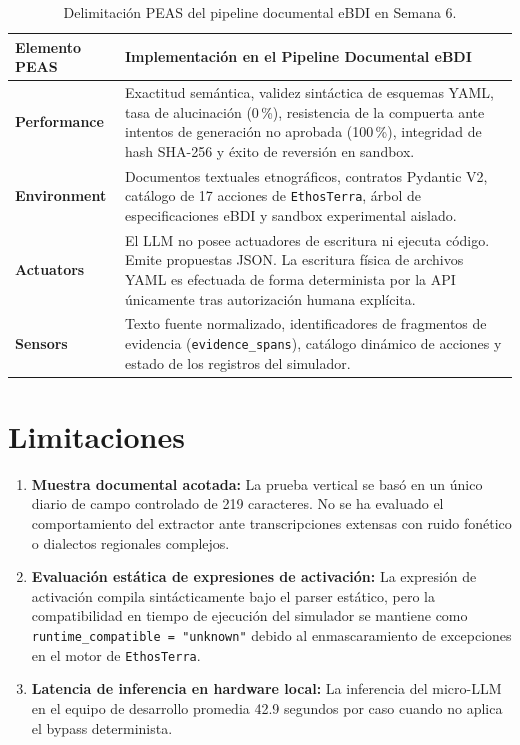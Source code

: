 \documentclass[11pt,a4paper]{article}
\begin{document}
\begin{table}[H]
\centering
\small
\begin{tabularx}{\textwidth}{lX}
\toprule
\textbf{Elemento PEAS} & \textbf{Implementación en el Pipeline Documental eBDI} \\
\midrule
\textbf{Performance} & Exactitud semántica, validez sintáctica de esquemas YAML, tasa de alucinación (0\,\%), resistencia de la compuerta ante intentos de generación no aprobada (100\,\%), integridad de hash SHA-256 y éxito de reversión en sandbox. \\
\textbf{Environment} & Documentos textuales etnográficos, contratos Pydantic V2, catálogo de 17 acciones de \texttt{EthosTerra}, árbol de especificaciones eBDI y sandbox experimental aislado. \\
\textbf{Actuators} & El LLM no posee actuadores de escritura ni ejecuta código. Emite propuestas JSON. La escritura física de archivos YAML es efectuada de forma determinista por la API únicamente tras autorización humana explícita. \\
\textbf{Sensors} & Texto fuente normalizado, identificadores de fragmentos de evidencia (\texttt{evidence\_spans}), catálogo dinámico de acciones y estado de los registros del simulador. \\
\bottomrule
\end{tabularx}
\caption{Delimitación PEAS del pipeline documental eBDI en Semana 6.}
\label{tab:peas}
\end{table}

\section{Limitaciones}
\begin{enumerate}[leftmargin=*]
    \item \textbf{Muestra documental acotada:} La prueba vertical se basó en un único diario de campo controlado de 219 caracteres. No se ha evaluado el comportamiento del extractor ante transcripciones extensas con ruido fonético o dialectos regionales complejos.
    \item \textbf{Evaluación estática de expresiones de activación:} La expresión de activación compila sintácticamente bajo el parser estático, pero la compatibilidad en tiempo de ejecución del simulador se mantiene como \texttt{runtime\_compatible = "unknown"} debido al enmascaramiento de excepciones en el motor de \texttt{EthosTerra}.
    \item \textbf{Latencia de inferencia en hardware local:} La inferencia del micro-LLM en el equipo de desarrollo promedia 42.9 segundos por caso cuando no aplica el bypass determinista.
\end{enumerate}
\end{document}
